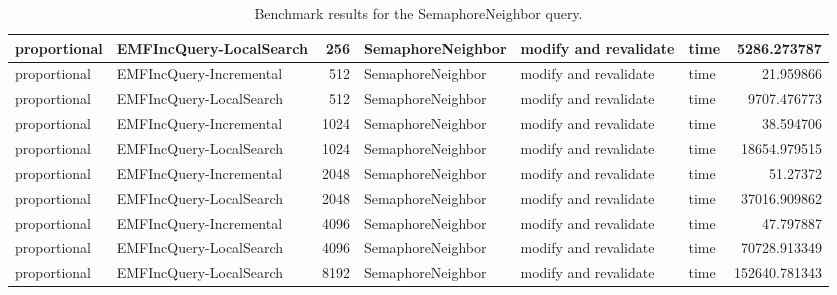 \begin{table}
\begin{tabular}{| l | l | r | l | l | l | r |}
proportional & EMFIncQuery-LocalSearch & 256 & SemaphoreNeighbor & modify and revalidate & time & 5286.273787\\\hline
proportional & EMFIncQuery-Incremental & 512 & SemaphoreNeighbor & modify and revalidate & time & 21.959866\\\hline
proportional & EMFIncQuery-LocalSearch & 512 & SemaphoreNeighbor & modify and revalidate & time & 9707.476773\\\hline
proportional & EMFIncQuery-Incremental & 1024 & SemaphoreNeighbor & modify and revalidate & time & 38.594706\\\hline
proportional & EMFIncQuery-LocalSearch & 1024 & SemaphoreNeighbor & modify and revalidate & time & 18654.979515\\\hline
proportional & EMFIncQuery-Incremental & 2048 & SemaphoreNeighbor & modify and revalidate & time & 51.27372\\\hline
proportional & EMFIncQuery-LocalSearch & 2048 & SemaphoreNeighbor & modify and revalidate & time & 37016.909862\\\hline
proportional & EMFIncQuery-Incremental & 4096 & SemaphoreNeighbor & modify and revalidate & time & 47.797887\\\hline
proportional & EMFIncQuery-LocalSearch & 4096 & SemaphoreNeighbor & modify and revalidate & time & 70728.913349\\\hline
proportional & EMFIncQuery-LocalSearch & 8192 & SemaphoreNeighbor & modify and revalidate & time & 152640.781343\\\hline

\end{tabular}\caption{Benchmark results for the \textsf{SemaphoreNeighbor} query.}
\label{tab:revalidation-semaphoreneighbor}
\end{table}
